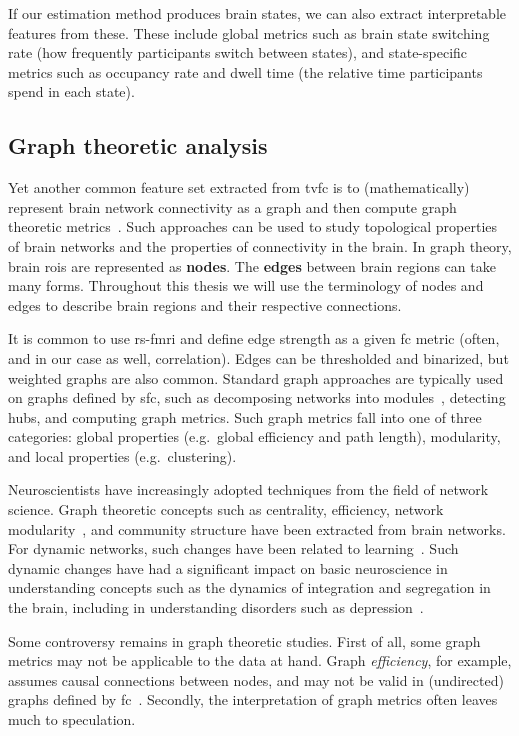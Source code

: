 If our estimation method produces brain states, we can also extract interpretable features from these.
These include global metrics such as brain state switching rate (how frequently participants switch between states),
and state-specific metrics such as occupancy rate and dwell time (the relative time participants spend in each state).

\subsection{Graph theoretic analysis}
\label{subsec:graph-theoretic-analysis}

Yet another common feature set extracted from \gls{tvfc} is to (mathematically) represent brain network connectivity as a graph and then compute graph theoretic metrics~\parencite{Sporns2011}.
Such approaches can be used to study topological properties of brain networks and the properties of connectivity in the brain.
In graph theory, brain \glspl{roi} are represented as \textbf{nodes}.
The \textbf{edges} between brain regions can take many forms.
Throughout this thesis we will use the terminology of nodes and edges to describe brain regions and their respective connections.

It is common to use \gls{rs-fmri} and define edge strength as a given \gls{fc} metric (often, and in our case as well, correlation).
Edges can be thresholded and binarized, but weighted graphs are also common.
Standard graph approaches are typically used on graphs defined by \gls{sfc}, such as decomposing networks into modules~\parencite{Betzel2016}, detecting hubs, and computing graph metrics.
Such graph metrics fall into one of three categories: global properties (e.g.~global efficiency and path length), modularity, and local properties (e.g.~clustering).

Neuroscientists have increasingly adopted techniques from the field of network science.
Graph theoretic concepts such as centrality, efficiency, network modularity~\parencite{Zalesky2014}, and community structure have been extracted from brain networks.
For dynamic networks, such changes have been related to learning~\parencite{Bassett2011}.
Such dynamic changes have had a significant impact on basic neuroscience in understanding concepts such as the dynamics of integration and segregation in the brain, including in understanding disorders such as depression~\parencite{Gong2015}.

Some controversy remains in graph theoretic studies.
First of all, some graph metrics may not be applicable to the data at hand.
Graph \emph{efficiency}, for example, assumes causal connections between nodes, and may not be valid in (undirected) graphs defined by \gls{fc}~\parencite{Chen2017}.
Secondly, the interpretation of graph metrics often leaves much to speculation.

